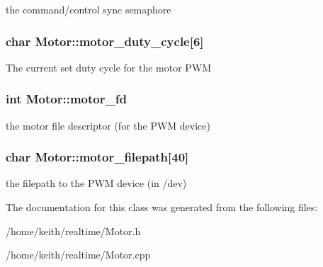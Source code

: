 the command/control sync semaphore \hypertarget{classMotor_a158ba3b940abdc85c7c1e4b1bf651a6e}{
\subsubsection[{motor\-\_\-duty\-\_\-cycle}]{\setlength{\rightskip}{0pt plus 5cm}char Motor\-::motor\-\_\-duty\-\_\-cycle\mbox{[}6\mbox{]}\hspace{0.3cm}{\ttfamily [protected]}}}\label{classMotor_a158ba3b940abdc85c7c1e4b1bf651a6e}
The current set duty cycle for the motor P\-W\-M \hypertarget{classMotor_acb2ac1bd2630b05c40a64154a87ea65d}{
\subsubsection[{motor\-\_\-fd}]{\setlength{\rightskip}{0pt plus 5cm}int Motor\-::motor\-\_\-fd\hspace{0.3cm}{\ttfamily [protected]}}}\label{classMotor_acb2ac1bd2630b05c40a64154a87ea65d}
the motor file descriptor (for the P\-W\-M device) \hypertarget{classMotor_aed42ebef60a1374fc86dd2aff59af85e}{
\subsubsection[{motor\-\_\-filepath}]{\setlength{\rightskip}{0pt plus 5cm}char Motor\-::motor\-\_\-filepath\mbox{[}40\mbox{]}\hspace{0.3cm}{\ttfamily [protected]}}}\label{classMotor_aed42ebef60a1374fc86dd2aff59af85e}
the filepath to the P\-W\-M device (in /dev) 

The documentation for this class was generated from the following files\-:\begin{DoxyCompactItemize}
\item 
/home/keith/realtime/Motor.\-h\item 
/home/keith/realtime/Motor.\-cpp\end{DoxyCompactItemize}
